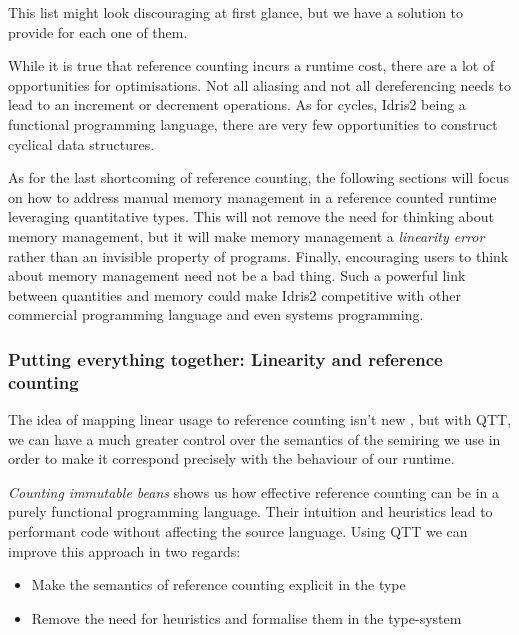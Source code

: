 \documentclass[
]{article}
\providecommand{\tightlist}{%
  \setlength{\itemsep}{0pt}\setlength{\parskip}{0pt}}
\begin{document}
This list might look discouraging at first glance, but we have a
solution to provide for each one of them.

While it is true that reference counting incurs a runtime cost, there
are a lot of opportunities for optimisations. Not all aliasing and not
all dereferencing needs to lead to an increment or decrement operations.
As for cycles, Idris2 being a functional programming language, there are
very few opportunities to construct cyclical data structures.

As for the last shortcoming of reference counting, the following
sections will focus on how to address manual memory management in a
reference counted runtime leveraging quantitative types. This will not
remove the need for thinking about memory management, but it will make
memory management a \emph{linearity error} rather than an invisible
property of programs. Finally, encouraging users to think about memory
management need not be a bad thing. Such a powerful link between
quantities and memory could make Idris2 competitive with other
commercial programming language and even systems programming.

\hypertarget{putting-everything-together-linearity-and-reference-counting}{%
\subsubsection{Putting everything together: Linearity and reference
counting}\label{putting-everything-together-linearity-and-reference-counting}}

The idea of mapping linear usage to reference counting isn't new
\cite{linear_ref_count}, but with QTT, we can have a much greater
control over the semantics of the semiring we use in order to make it
correspond precisely with the behaviour of our runtime.

\emph{Counting immutable beans}\cite{immutable_beans} shows us how
effective reference counting can be in a purely functional programming
language. Their intuition and heuristics lead to performant code without
affecting the source language. Using QTT we can improve this approach in
two regards:

\begin{itemize}
\tightlist
\item
  Make the semantics of reference counting explicit in the type
\item
  Remove the need for heuristics and formalise them in the type-system
\end{itemize}
\end{document}
